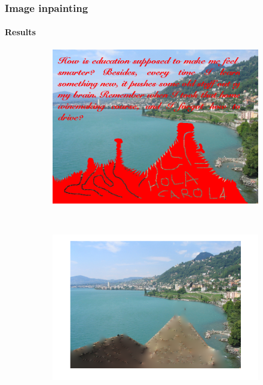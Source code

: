 \documentclass[11pt]{beamer}
\begin{document}
\begin{frame}
\frametitle{Image inpainting}
\framesubtitle{Results}
\begin{figure}
    \centering
    \begin{subfigure}[b]{0.4\textwidth}
        \includegraphics[width=\textwidth]{Image_to_Restore}

    \end{subfigure}
    ~ 
        \begin{subfigure}[b]{0.5\textwidth}
        \includegraphics[width=\textwidth]{Image_Restored}

    \end{subfigure}

\end{figure}
\end{frame}
\end{document}

